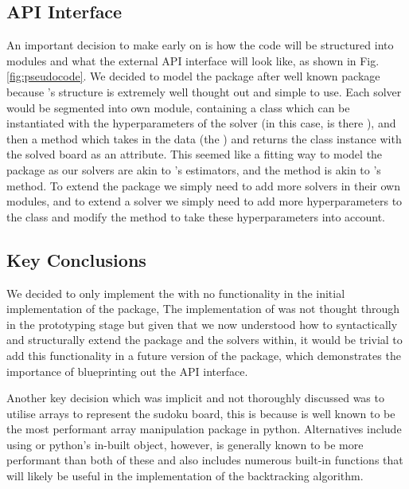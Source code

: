     \subsection{API Interface}\label{subsec:api-interface}
    An important decision to make early on is how the code will be structured into modules and what the external
    API interface will look like, as shown in Fig.\eqref{fig:pseudocode}.
    We decided to model the  package after well known  \cite{scikit-repo}
    package because 's structure is extremely well thought out and simple to use.
    Each solver would be segmented into own module, containing a class which can be instantiated with the hyperparameters
    of the solver (in this case, is there ), and then a  method which
    takes in the data (the ) and returns the class instance with the solved board as an attribute.
    This seemed like a fitting way to model the package as our solvers are akin to 's estimators,
    and the  method is akin to 's  method.
    To extend the package we simply need to add more solvers in their own modules, and to extend a solver we simply need
    to add more hyperparameters to the class and modify the  method to take these hyperparameters into
    account.

    \subsection{Key Conclusions}\label{subsec:key-conclusions}
    We decided to only implement the  with no  functionality
    in the initial  implementation of the package,
    The implementation of  was not thought through in the prototyping stage but given that
    we now understood how to syntactically and structurally extend the package and the solvers within, it would be trivial
    to add this functionality in a future version of the package, which demonstrates the importance of blueprinting out
    the API interface.

    Another key decision which was implicit and not thoroughly discussed was to utilise  arrays to
    represent the sudoku board, this is because  is well known to be the most performant array manipulation
    package in python.
    Alternatives include using  or python's in-built  object, however, 
    is generally known to be more performant than both of these and  also includes numerous built-in functions
    that will likely be useful in the implementation of the backtracking algorithm.

